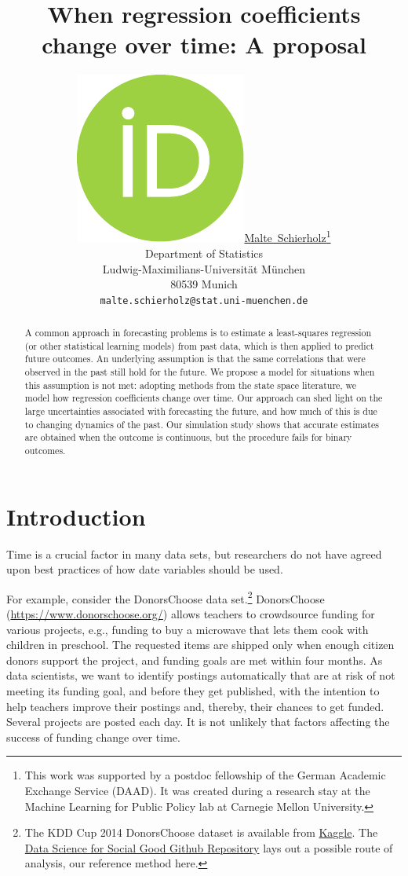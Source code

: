 \documentclass{article}
\title{When regression coefficients change over time: A proposal}
\author{ \href{https://orcid.org/0000-0003-4058-1543}{\includegraphics[scale=0.06]{orcid.pdf}\hspace{1mm}Malte~Schierholz}\thanks{This work was supported by a postdoc fellowship of the German Academic Exchange Service (DAAD). It was created during a research stay at the Machine Learning for Public Policy lab at Carnegie Mellon University.} \\
	Department of Statistics\\
	Ludwig-Maximilians-Universität München\\
	80539 Munich \\
	\texttt{malte.schierholz@stat.uni-muenchen.de} \\
}
\begin{document}
\maketitle

\begin{abstract}
	A common approach in forecasting problems is to estimate a least-squares regression (or other statistical learning models) from past data, which is then applied to predict future outcomes. An underlying assumption is that the same correlations that were observed in the past still hold for the future. We propose a model for situations when this assumption is not met: adopting methods from the state space literature, we model how regression coefficients change over time. Our approach can shed light on the large uncertainties associated with forecasting the future, and how much of this is due to changing dynamics of the past. Our simulation study shows that accurate estimates are obtained when the outcome is continuous, but the procedure fails for binary outcomes.
\end{abstract}




\section{Introduction}\label{sec:introduction}

Time is a crucial factor in many data sets, but researchers do not have agreed upon best practices of how date variables should be used.

For example, consider the DonorsChoose data set.\footnote{The KDD Cup 2014 DonorsChoose dataset is available from \href{https://www.kaggle.com/c/kdd-cup-2014-predicting-excitement-at-donors-choose/data}{Kaggle}. The \href{https://github.com/dssg/donors-choose}{Data Science for Social Good Github Repository} lays out a possible route of analysis, our reference method here.} DonorsChoose (\url{https://www.donorschoose.org/}) allows teachers to crowdsource funding for various projects, e.g., funding to buy a microwave that lets them cook with children in preschool. The requested items are shipped only when enough citizen donors support the project, and funding goals are met within four months. As data scientists, we want to identify postings automatically that are at risk of not meeting its funding goal, and before they get published, with the intention to help teachers improve their postings and, thereby, their chances to get funded. Several projects are posted each day. It is not unlikely that factors affecting the success of funding change over time.
\end{document}
